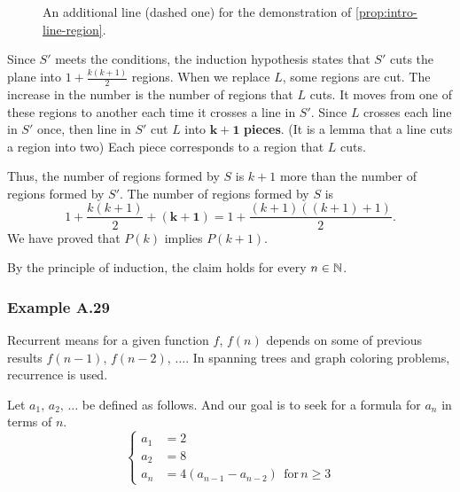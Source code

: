 \documentclass[../src/handouts/main.tex]{subfiles}
\begin{document}
\begin{figure}[ht]
  \centering
  \caption{An additional line (dashed one) for the demonstration of \cref{prop:intro-line-region}.}
  \label{fig:intro-line-region-additional}
\end{figure}

Since $S'$ meets the conditions, the induction hypothesis states that $S'$ cuts the plane into $1 + \frac{k (k + 1)}{2}$ regions.
When we replace $L$, some regions are cut.
The increase in the number is the number of regions that $L$ cuts. It moves from one of these regions to another each time it crosses a line in $S'$.
Since $L$ crosses each line in $S'$ once, then line in $S'$ cut $L$ into $\bm{k + 1}$ \textbf{pieces}. (It is a lemma that a line cuts a region into two)
Each piece corresponds to a region that $L$ cuts.

Thus, the number of regions formed by $S$ is $k + 1$ more than the number of regions formed by $S'$.
The number of regions formed by $S$ is
$$
  1 + \frac{k (k + 1)}{2} + \bm{(k + 1)} = 1 + \frac{(k + 1)((k + 1) + 1)}{2}.
$$
We have proved that $P(k)$ implies $P(k + 1)$.

By the principle of induction, the claim holds for every $n \in \mathbb{N}$.


\subsubsection{Example A.29}

Recurrent means for a given function $f$, $f(n)$ depends on some of previous results $f(n - 1),\, f(n - 2),\, \ldots$. In spanning trees and graph coloring problems, recurrence is used.

Let $a_1,\, a_2,\, \ldots$ be defined as follows. And our goal is to seek for a formula for $a_n$ in terms of $n$.
$$
  \begin{cases}
    a_1 & = 2                                                   \\
    a_2 & = 8                                                   \\
    a_n & = 4 (a_{n - 1} - a_{n - 2}) \ \ \text{for}\, n \geq 3
  \end{cases}
$$
\end{document}

